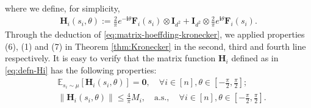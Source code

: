 where we define, for simplicity,
\begin{align}\label{eq:defn-Hi}
\bm{H}_i(s_i,\theta):= \frac{2}{\pi}e^{-\mathbf{i}\theta}\bm{F}_i(s_i) \otimes \bm{I}_{d^2} + \bm{I}_{d^2} \otimes \frac{2}{\pi}e^{\mathbf{i}\theta}\bm{F}_i(s_i).
\end{align}
Through the deduction of \eqref{eq:matrix-hoeffding-kronecker}, we applied properties (6), (1) and (7) in Theorem \ref{thm:Kronecker} in the second, third and fourth line respectively. 
It is easy to verify that the matrix function $\bm{H}_i$ defined as in \eqref{eq:defn-Hi} has the following properties:
\begin{align}\label{eq:Hi-properties}
&\mathbb{E}_{s_i \sim \mu} [\bm{H}_i(s_i,\theta)] = \bm{0}, \quad \forall i \in [n], \theta \in \left[-\frac{\pi}{2},\frac{\pi}{2}\right];\\ 
&\|\bm{H}_i(s_i,\theta)\| \leq \frac{4}{\pi} M_i, \quad \text{a.s.}, \quad \forall i \in [n],  \theta \in \left[-\frac{\pi}{2},\frac{\pi}{2}\right].
\end{align}

